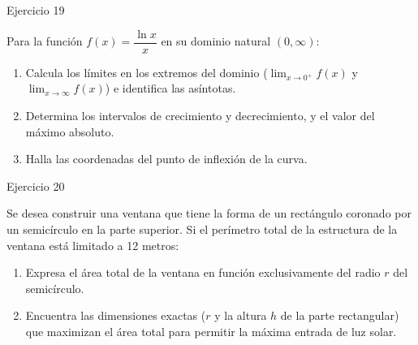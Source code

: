 \documentclass[aspectratio=169]{beamer}
\begin{document}
\begin{frame}{Ejercicio 19}
  \begin{mwejercicio}
    Para la función $f(x) = \dfrac{\ln x}{x}$ en su dominio natural $(0, \infty)$:
    \begin{enumerate}
      \item Calcula los límites en los extremos del dominio ($\lim_{x \to 0^+} f(x)$ y $\lim_{x \to \infty} f(x)$) e identifica las asíntotas.
      \item Determina los intervalos de crecimiento y decrecimiento, y el valor del máximo absoluto.
      \item Halla las coordenadas del punto de inflexión de la curva.
    \end{enumerate}
  \end{mwejercicio}
  \vspace{2.5cm}
\end{frame}
\begin{frame}{Ejercicio 20}
  \begin{mwejercicio}
    Se desea construir una ventana que tiene la forma de un rectángulo coronado por un semicírculo en la parte superior. Si el perímetro total de la estructura de la ventana está limitado a 12 metros:
    \begin{enumerate}
      \item Expresa el área total de la ventana en función exclusivamente del radio $r$ del semicírculo.
      \item Encuentra las dimensiones exactas ($r$ y la altura $h$ de la parte rectangular) que maximizan el área total para permitir la máxima entrada de luz solar.
    \end{enumerate}
  \end{mwejercicio}
  \vspace{2.5cm}
\end{frame}
\end{document}
